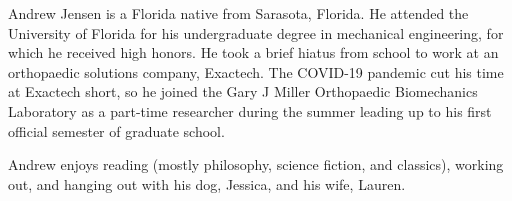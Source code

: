 Andrew Jensen is a Florida native from Sarasota, Florida. He attended the University of Florida for his undergraduate degree in mechanical engineering, for which he received high honors. He took a brief hiatus from school to work at an orthopaedic solutions company, Exactech. The COVID-19 pandemic cut his time at Exactech short, so he joined the Gary J Miller Orthopaedic Biomechanics Laboratory as a part-time researcher during the summer leading up to his first official semester of graduate school.

Andrew enjoys reading (mostly philosophy, science fiction, and classics), working out, and hanging out with his dog, Jessica, and his wife, Lauren.

